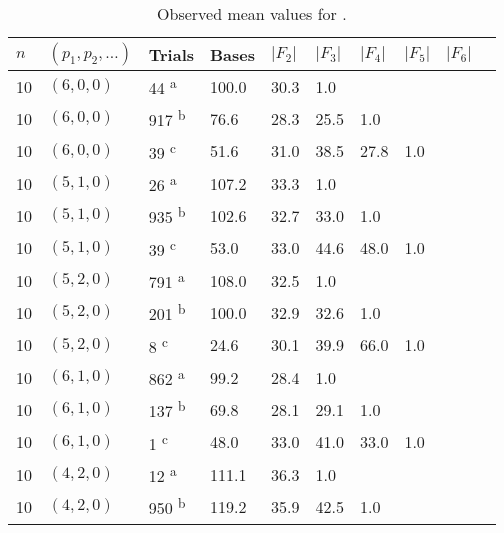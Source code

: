 \begin{table*}[ht]
  \centering
  \caption{Observed mean values for .}
  \label{tab:coarsening}
  \begin{threeparttable}
    \begin{tabular}{llllllllll}
      \toprule
      $n$ & $(p_1, p_2, \ldots)$ & Trials                  & Bases & $|F_2|$ & $|F_3|$ & $|F_4|$ & $|F_5|$ & $|F_6|$ \\
      \midrule
      10  & $(6, 0, 0)$          & 44 \textsuperscript{a}  & 100.0 & 30.3    & 1.0     &         &         &         \\
      10  & $(6, 0, 0)$          & 917 \textsuperscript{b} & 76.6  & 28.3    & 25.5    & 1.0     &         &         \\
      10  & $(6, 0, 0)$          & 39 \textsuperscript{c}  & 51.6  & 31.0    & 38.5    & 27.8    & 1.0     &         \\
      10  & $(5, 1, 0)$          & 26 \textsuperscript{a}  & 107.2 & 33.3    & 1.0     &         &         &         \\
      10  & $(5, 1, 0)$          & 935 \textsuperscript{b} & 102.6 & 32.7    & 33.0    & 1.0     &         &         \\
      10  & $(5, 1, 0)$          & 39 \textsuperscript{c}  & 53.0  & 33.0    & 44.6    & 48.0    & 1.0     &         \\
      10  & $(5, 2, 0)$          & 791 \textsuperscript{a} & 108.0 & 32.5    & 1.0     &         &         &         \\
      10  & $(5, 2, 0)$          & 201 \textsuperscript{b} & 100.0 & 32.9    & 32.6    & 1.0     &         &         \\
      10  & $(5, 2, 0)$          & 8 \textsuperscript{c}   & 24.6  & 30.1    & 39.9    & 66.0    & 1.0     &         \\
      10  & $(6, 1, 0)$          & 862 \textsuperscript{a} & 99.2  & 28.4    & 1.0     &         &         &         \\
      10  & $(6, 1, 0)$          & 137 \textsuperscript{b} & 69.8  & 28.1    & 29.1    & 1.0     &         &         \\
      10  & $(6, 1, 0)$          & 1 \textsuperscript{c}   & 48.0  & 33.0    & 41.0    & 33.0    & 1.0     &         \\
      10  & $(4, 2, 0)$          & 12 \textsuperscript{a}  & 111.1 & 36.3    & 1.0     &         &         &         \\
      10  & $(4, 2, 0)$          & 950 \textsuperscript{b} & 119.2 & 35.9    & 42.5    & 1.0     &         &         \\

\end{tabular}
\end{threeparttable}
\end{table*}

